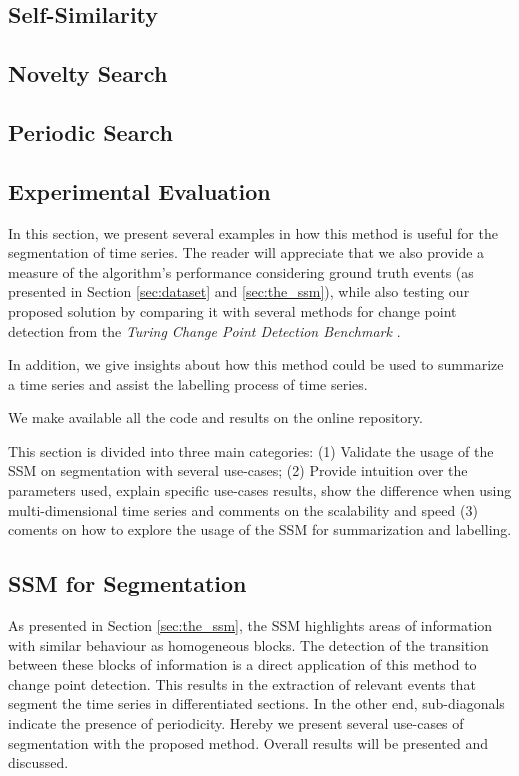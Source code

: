\subsection{Self-Similarity}
\subsection{Novelty Search}
\subsection{Periodic Search}


\subsection{Experimental Evaluation}

In this section, we present several examples in how this method is useful for the segmentation of time series. The reader will appreciate that we also provide a measure of the algorithm's performance considering ground truth events (as presented in Section \ref{sec:dataset} and \ref{sec:the_ssm}), while also testing our proposed solution by comparing it with several methods for change point detection from the \textit{Turing Change Point Detection Benchmark} \cite{cpd_alan}.
\par
In addition, we give insights about how this method could be used to summarize a time series and assist the labelling process of time series.
\par
We make available all the code and results on the online repository.
\par
This section is divided into three main categories: (1) Validate the usage of the \gls{SSM} on segmentation with several use-cases; (2) Provide intuition over the parameters used, explain specific use-cases results, show the difference when using multi-dimensional time series and comments on the scalability and speed (3) coments on how to explore the usage of the \gls{SSM} for summarization and labelling.

\subsection{\gls{SSM} for Segmentation}

As presented in Section \ref{sec:the_ssm}, the \gls{SSM} highlights areas of information with similar behaviour as homogeneous blocks. The detection of the transition between these blocks of information is a direct application of this method to change point detection. This results in the extraction of relevant events that segment the time series in differentiated sections. In the other end, sub-diagonals indicate the presence of periodicity. Hereby we present several use-cases of segmentation with the proposed method. Overall results will be presented and discussed.

